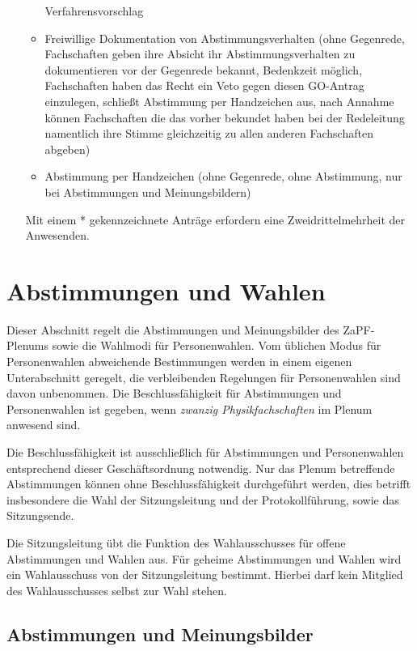 \documentclass[
  a4paper,
  oneside]{scrartcl}
\begin{document}
\begin{enumerate}
\begin{itemize}
    Verfahrensvorschlag
  \item
    Freiwillige Dokumentation von Abstimmungsverhalten (ohne Gegenrede,
    Fachschaften geben ihre Absicht ihr Abstimmungsverhalten zu
    dokumentieren vor der Gegenrede bekannt, Bedenkzeit möglich,
    Fachschaften haben das Recht ein Veto gegen diesen GO-Antrag
    einzulegen, schließt Abstimmung per Handzeichen aus, nach Annahme
    können Fachschaften die das vorher bekundet haben bei der
    Redeleitung namentlich ihre Stimme gleichzeitig zu allen anderen
    Fachschaften abgeben)
  \item
    Abstimmung per Handzeichen (ohne Gegenrede, ohne Abstimmung, nur bei
    Abstimmungen und Meinungsbildern)
  \end{itemize}

  Mit einem * gekennzeichnete Anträge erfordern eine Zweidrittelmehrheit
  der Anwesenden.
\end{enumerate}

\section{Abstimmungen und Wahlen}\label{abstimmungen-und-wahlen}

Dieser Abschnitt regelt die Abstimmungen und Meinungsbilder des
ZaPF-Plenums sowie die Wahlmodi für Personenwahlen. Vom üblichen Modus
für Personenwahlen abweichende Bestimmungen werden in einem eigenen
Unterabschnitt geregelt, die verbleibenden Regelungen für Personenwahlen
sind davon unbenommen. Die Beschlussfähigkeit für Abstimmungen und
Personenwahlen ist gegeben, wenn \emph{zwanzig Physikfachschaften} im
Plenum anwesend sind.

Die Beschlussfähigkeit ist ausschließlich für Abstimmungen und
Personenwahlen entsprechend dieser Geschäftsordnung notwendig. Nur das
Plenum betreffende Abstimmungen können ohne Beschlussfähigkeit
durchgeführt werden, dies betrifft insbesondere die Wahl der
Sitzungsleitung und der Protokollführung, sowie das Sitzungsende.

Die Sitzungsleitung übt die Funktion des Wahlausschusses für offene
Abstimmungen und Wahlen aus. Für geheime Abstimmungen und Wahlen wird
ein Wahlausschuss von der Sitzungsleitung bestimmt. Hierbei darf kein
Mitglied des Wahlausschusses selbst zur Wahl stehen.

\subsection{Abstimmungen und
Meinungsbilder}\label{abstimmungen-und-meinungsbilder}
\end{document}
